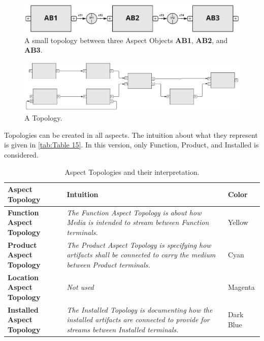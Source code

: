 \begin{figure}[htb]
  \centering
  \includegraphics[width=1\textwidth]{img/IMFmanual-img045.jpg}
  \caption{A small topology between three Aspect Objects \textbf{AB1}, \textbf{AB2}, and \textbf{AB3}.}
  \label{fig:Figure 26}
\end{figure}

\begin{figure}[htb]
  \centering
  \includegraphics[width=1\textwidth]{img/IMFmanual-img046.jpg}
  \caption{A Topology.}
  \label{fig:Figure 27}
\end{figure}

Topologies can be created in all aspects. The intuition about what they represent is given in \autoref{tab:Table 15}. In this
version, only Function, Product, and Installed is considered.

\begin{table}[htb]\centering\caption{Aspect Topologies and their interpretation.}\label{tab:Table 15}
  \begin{supertabular}{|m{1.2962599in}|m{4.06286in}|m{0.8073598in}|}
    \hline
    {\bfseries Aspect Topology} &
    \textbf{Intuition} &
    {\bfseries Color}\\\hline
    {\bfseries Function Aspect Topology} &
    \textit{The Function Aspect Topology is about how Media is intended to stream between Function terminals.} &
    Yellow\\\hline
    {\bfseries Product Aspect Topology} &
    \textit{The Product Aspect Topology is specifying how artifacts shall be connected to carry }\textit{the medium }\textit{between Product terminals.} &
    Cyan\\\hline
    {\bfseries Location Aspect Topology} &
    \textit{Not used} &
    Magenta\\\hline
    {\bfseries Installed Aspect Topology} &
    \textit{The Installed Topology is documenting how the installed artifacts are connected to provide for streams between
      Installed terminals.} &
    { Dark Blue}\\\hline
  \end{supertabular}
\end{table}

